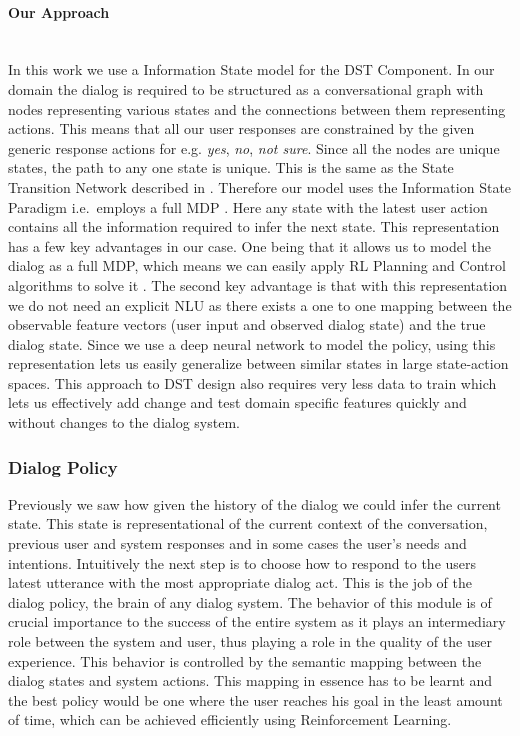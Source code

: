 \documentclass[14pt]{extarticle}
\newcommand{\myparagraph}[1]{\paragraph{#1}\mbox{}\\ \linebreak}
\numberwithin{equation}{section}
\begin{document}
	\myparagraph{Our Approach}	
	In this work we use a Information State model for the DST Component. In our domain the dialog is required to be structured as a conversational graph with nodes representing various states and the connections between them representing actions. This means that all our user responses are constrained by the given generic response actions for e.g. \textit{yes}, \textit{no}, \textit{not sure}. Since all the nodes are unique states, the path to any one state is unique. This is the same as the State Transition Network described in \cite{Sutton-introRL}. Therefore our model uses the Information State Paradigm i.e.\ employs a full MDP \cite{Larsson:2000:ISD:973935.973943}. Here any state with the latest user action contains all the information required to infer the next state. This representation has a few key advantages in our case. One being that it allows us to model the dialog as a full MDP, which means we can easily apply RL Planning and Control algorithms to solve it \cite{Sutton-introRL}.  The second key advantage is that with this representation we do not need an explicit NLU as there exists a one to one mapping between the observable feature vectors (user input and observed dialog state) and the true dialog state. Since we use a deep neural network to model the policy, using this representation lets us easily generalize between similar states in large state-action spaces. This approach to DST design also requires very less data to train which lets us effectively add change and test domain specific features quickly and without changes to the dialog system.
	\subsubsection{Dialog Policy} 
	Previously we saw how given the history of the dialog we could infer the current state. This state is representational of the current context of the conversation, previous user and system responses and in some cases the user's needs and intentions. Intuitively the next step is to choose how to respond to the users latest utterance with the most appropriate dialog act. This is the job of the dialog policy, the brain of any dialog system. The behavior of this module is of crucial importance to the success of the entire system as it plays an intermediary role between the system and user, thus playing a role in the quality of the user experience. This behavior is controlled by the semantic mapping between the dialog states and system actions. This mapping in essence has to be learnt and the best policy would be one where the user reaches his goal in the least amount of time, which can be achieved efficiently using Reinforcement Learning. 
	
\end{document}
